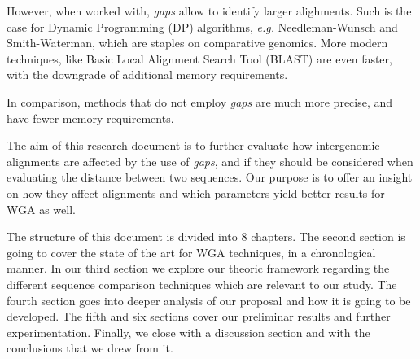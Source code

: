 \medskip

However, when worked with, \textit{gaps} allow to identify larger alighments. Such is the case for Dynamic Programming (DP) algorithms, \textit{e.g.} Needleman-Wunsch and Smith-Waterman, which are staples on comparative genomics. More modern techniques, like Basic Local Alignment Search Tool (BLAST) are even faster, with the downgrade of additional memory requirements. 

\medskip

In comparison, methods that do not employ \textit{gaps} are much more precise, and have fewer memory requirements.

\medskip

The aim of this research document is to further evaluate how intergenomic alignments are affected by the use of \textit{gaps}, and if they should be considered when evaluating the distance between two sequences. Our purpose is to offer an insight on how they affect alignments and which parameters yield better results for WGA as well.

\medskip

The structure of this document is divided into 8 chapters. The second section is going to cover the state of the art for WGA techniques, in a chronological manner. In our third section we explore our theoric framework regarding the different sequence comparison techniques which are relevant to our study. The fourth section goes into deeper analysis of our proposal and how it is going to be developed. The fifth and six sections cover our preliminar results and further experimentation. Finally, we close with a discussion section and with the conclusions that we drew from it.
